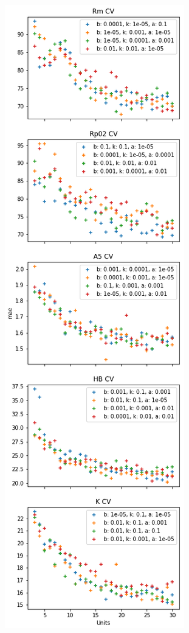 \begin{figure}
\begin{subfigure}[b]{0.37\textwidth}
         \includegraphics[width=\textwidth]{images/perf_avg_mae.png}

\end{subfigure}
\end{figure}
